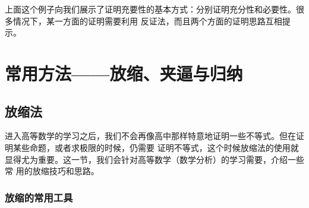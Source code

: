 上面这个例子向我们展示了证明充要性的基本方式：分别证明充分性和必要性。很多情况下，某一方面的证明需要利用
反证法，而且两个方面的证明思路互相提示。

\section{常用方法——放缩、夹逼与归纳}
\subsection{放缩法}
进入高等数学的学习之后，我们不会再像高中那样特意地证明一些不等式。但在证明某些命题，或者求极限的时候，仍需要
证明不等式，这个时候放缩法的使用就显得尤为重要。这一节，我们会针对高等数学（数学分析）的学习需要，介绍一些常
用的放缩技巧和思路。
\subsubsection{放缩的常用工具}
